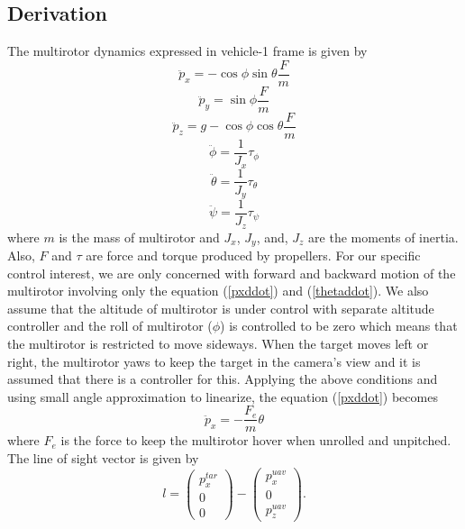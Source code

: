 \subsection{Derivation}
The multirotor dynamics expressed in vehicle-1 frame \cite{Beard2008} is given by 
\begin{equation}
\ddot{p}_x=-\cos\phi\sin\theta\frac{F}{m}
\label{pxddot}
\end{equation}
\begin{equation}
\ddot{p}_y=\sin\phi\frac{F}{m}
\end{equation}
\begin{equation}
\ddot{p}_z=g-\cos\phi\cos\theta\frac{F}{m}
\end{equation}
\begin{equation}
\ddot{\phi}=\frac{1}{J_x}\tau_{\phi}
\end{equation}
\begin{equation}
\ddot{\theta}=\frac{1}{J_y}\tau_{\theta}
\label{thetaddot}
\end{equation}
\begin{equation}
\ddot{\psi}=\frac{1}{J_z}\tau_{\psi}
\end{equation}
where $m$ is the mass of multirotor and $J_x$, $J_y$, and, $J_z$ are the moments of inertia. Also, $F$ and $\tau$ are force and torque produced by propellers. For our specific control interest, we are only concerned with forward and backward motion of the multirotor involving only the equation (\ref{pxddot}) and (\ref{thetaddot}). We also assume that the altitude of multirotor is under control with separate altitude controller and the roll of multirotor ($\phi$) is controlled to be zero which means that the multirotor is restricted to move sideways. When the target moves left or right, the multirotor yaws to keep the target in the camera's view and it is assumed that there is a controller for this. Applying the above conditions and using small angle approximation to linearize, the equation (\ref{pxddot}) becomes 
\begin{equation}
\ddot{p}_x=-\frac{F_e}{m}\theta
\end{equation}
where $F_e$ is the force to keep the multirotor hover when unrolled and unpitched. The line of sight vector is given by 
\begin{equation}
l=\begin{pmatrix}
p_x^{tar} \\ 0 \\ 0
\end{pmatrix}
-\begin{pmatrix}
p_x^{uav} \\ 0 \\ p_z^{uav}
\end{pmatrix}.
\label{l}
\end{equation}

